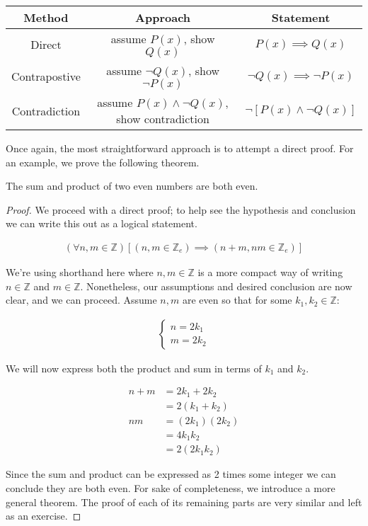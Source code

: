 \documentclass{report}
\begin{document}
\vspace{\baselineskip}
\begin{center}
	\begin{tabular}{ccc}
		\toprule
		Method & Approach & Statement \\
		\midrule
		Direct & assume $P(x)$, show $Q(x)$ & $P(x) \implies Q(x)$ \\
		Contrapostive & assume $\neg Q(x)$, show $\neg P(x)$ & $\neg Q(x) \implies \neg P(x)$ \\
		Contradiction & assume $P(x) \wedge \neg Q(x)$, show contradiction & $\neg[P(x) \wedge \neg Q(x)]$ \\
		\bottomrule
	\end{tabular}
\end{center}

Once again, the most straightforward approach is to attempt a direct proof. For an example, we prove the following theorem.

\vspace{\baselineskip}
\begin{theorem}
	The sum and product of two even numbers are both even. 
\end{theorem}

\begin{proof}
	We proceed with a direct proof; to help see the hypothesis and conclusion we can write this out as a logical statement.
	
	\begin{align*}
		(\forall n, m \in \mathbb{Z})[(n, m \in \mathbb{Z}_e) \implies (n + m, nm \in \mathbb{Z}_e)]
	\end{align*}
	
	We're using shorthand here where $n, m \in \mathbb{Z}$ is a more compact way of writing $n \in \mathbb{Z}$ and $m \in \mathbb{Z}$. Nonetheless, our assumptions and desired conclusion are now clear, and we can proceed. Assume $n, m$ are even so that for some $k_1, k_2 \in \mathbb{Z}$:
	
	\begin{align*}
		\begin{cases}
			n = 2 k_1 \\
			m = 2 k_2
		\end{cases}
	\end{align*} 
	
	We will now express both the product and sum in terms of $k_1$ and $k_2$.
	
	\begin{align*}
		n + m &= 2 k_1 + 2 k_2 \\
		&= 2 (k_1 + k_2) \\
		nm &= (2 k_1)(2 k_2) \\
		&= 4 k_1 k_2 \\
		&= 2 (2 k_1 k_2)
	\end{align*}
	
	Since the sum and product can be expressed as 2 times some integer we can conclude they are both even. For sake of completeness, we introduce a more general theorem. The proof of each of its remaining parts are very similar and left as an exercise.
\end{proof}
\vspace{\baselineskip}
\end{document}
